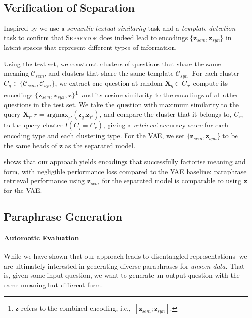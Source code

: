 \documentclass[11pt,a4paper]{article}
\begin{document}
\subsection{Verification of Separation}

Inspired by \citet{chen-etal-2019-multi} we use a \textit{semantic textual similarity} task and a \textit{template detection} task to confirm that \textsc{Separator} does indeed lead to encodings $\{\textbf{z}_{sem}, \textbf{z}_{syn}\}$ in latent spaces that represent different types of information. 

Using the test set, we construct clusters of questions that share the
same meaning $\mathcal{C}_{sem}$, and clusters that share the same
template $\mathcal{C}_{syn}$. For each cluster $C_q \in
\{\mathcal{C}_{sem}, \mathcal{C}_{syn}\}$, we extract one question at
random $\textbf{X}_q \in C_q$, compute its encodings
$\{\textbf{z}_{sem}, \textbf{z}_{syn},
\textbf{z}\}$\footnote{$\textbf{z}$ refers to the combined encoding,
i.e.,~$[\textbf{z}_{sem}; \textbf{z}_{syn}]$.}, and its cosine
similarity to the encodings of all other questions in the test set. We
take the question with maximum similarity to the query $\textbf{X}_r,
r = \text{argmax}_{r'}( \textbf{z}_q . \textbf{z}_{r'})$, and compare
the cluster that it belongs to, $C_r$, to the query cluster $I(C_q =
C_r)$, giving a \textit{retrieval} accuracy score for each encoding
type and each clustering type. For the VAE, we set
$\{\textbf{z}_{sem}, \textbf{z}_{syn}\}$ to be the same heads of
$\textbf{z}$ as the separated model.






 shows that our approach yields encodings that successfully factorise meaning and form, with negligible performance loss compared to the VAE baseline; paraphrase retrieval performance using $\textbf{z}_{sem}$ for the separated model is comparable to using $\textbf{z}$ for the VAE.
















\subsection{Paraphrase Generation}

\paragraph{Automatic Evaluation} 
While we have shown that our approach leads to disentangled
representations, we are ultimately interested in generating diverse
paraphrases for \textit{unseen data}. That is, given some input
question, we want to generate an output question with the same meaning
but different form.
\end{document}
